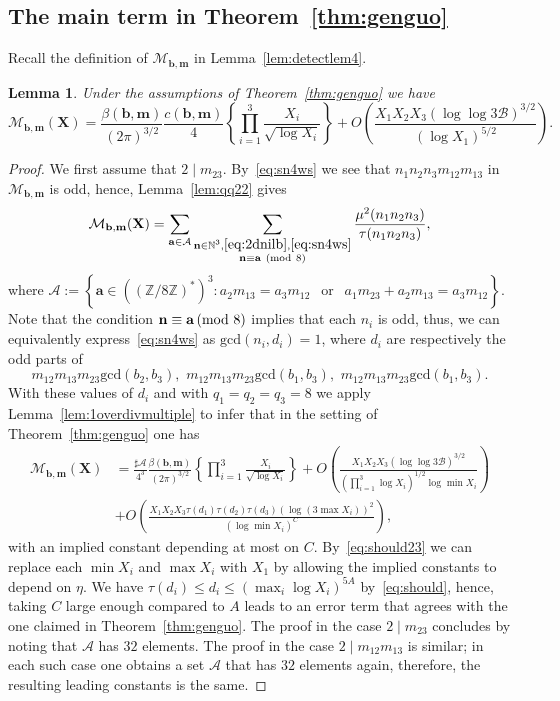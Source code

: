 \documentclass[a4paper,12pt,reqno]{amsart}
\numberwithin{equation}{section} \numberwithin{figure}{section}
\newcommand\Z{\mathbb{Z}}
\newcommand\N{\mathbb{N}}
\renewcommand{\mod}[1]{ \ \left(\textnormal{mod}\ #1\right)}
\newcommand{\md}[1]{  \left(\textnormal{mod}\ #1\right)}
\renewcommand{\l}{\left}
\renewcommand{\r}{\right}
\renewcommand{\b}{\mathbf}
\renewcommand{\c}{\mathcal}
\renewcommand{\gcd}{\textrm{gcd}}
\renewcommand{\leq}{\leqslant}
\renewcommand{\#}{\sharp}
\newtheorem{lemma}{Lemma}
\theoremstyle{definition}
\numberwithin{lemma}{section}
\begin{document}
 
\subsection{The main term in Theorem~\ref{thm:genguo}}
\label{s:maintermthrm}
Recall the definition of  $\c M_{\b b , \b m }$ in Lemma~\ref{lem:detectlem4}.
\begin{lemma}\label{maintermlemfg7}Under the assumptions of Theorem~\ref{thm:genguo} we have  
\[
\c M_{\b b , \b m }(\b X)
=
\frac{\beta(\b b , \b m )  }{(2\pi )^{3/2} }
\frac{c(\b b , \b m )}{4 }
\l\{
\prod_{i=1}^3 \frac{X_i }{ \sqrt{  \log X_i}   }  \r\}  
 +O\l(\frac{X_1X_2X_3 (\log \log 3\c B)^{3/2}}{(  \log X_1)^{5/2} }\r) 
.\]
\end{lemma}
\begin{proof}
We first assume that
 $2\mid m_{23}$.  By~\eqref{eq:sn4ws} we see that   $n_1n_2n_3 m_{12}m_{13}$ in $\c M_{\b b , \b m }$ 
is odd, hence,  Lemma~\ref{lem:qq22} gives 
$$\c M_{\b b , \b m }(\b X)=\sum_{ \b a \in \c A } 
\sum_{\substack{\b n \in \N^3, \eqref{eq:2dnilb}, \eqref{eq:sn4ws}  \\
\b n \equiv \b a \mod 8 }} 
 \frac{\mu^2(n_1n_2n_3)}{\tau(n_1n_2n_3 )} 
,$$where   $\c A:= \l\{ \b a \in  ((\Z/8\Z)^*)^3 :  a_2    m_{13} =      a_3   m_{12}   \ \  \text{ or }  \  \ 
a_1    m_{23} +a_2    m_{13}     =     a_3   m_{12}\r\} $.
Note that the condition $\b n \equiv \b a \md 8$ 
implies that each $n_i $ is odd, thus, we can equivalently express~\eqref{eq:sn4ws}
as $\gcd(n_i,d_i)=1$, where  $d_i$ are respectively the odd parts of 
$$
m_{12} m_{13}  m_{23}    \gcd(   b_2,b_3), \,\,
 m_{12} m_{13}  m_{23}    \gcd(   b_1,b_3), \,\, m_{12} m_{13}  m_{23}    \gcd(   b_1,b_3) 
.$$ With these values of $d_i$ and with  $q_1=q_2=q_3=8$ 
we apply     Lemma~\ref{lem:1overdivmultiple} to infer that in the setting of Theorem~\ref{thm:genguo} one has 
\begin{align*}  
\c M_{\b b , \b m }(\b X)
&
=
\frac{\#\c A}{4^3}
\frac{\beta(\b b , \b m )  }{(2\pi )^{3/2} }
\l\{
\prod_{i=1}^3 \frac{X_i }{ \sqrt{  \log X_i}   }  \r\}  
 +O\l(\frac{X_1X_2X_3 (\log \log 3\c B)^{3/2}}{(\prod_{i=1}^3 \log X_i)^{1/2}\log \min X_i }\r) 
\\&
+O\l(\frac{X_1X_2X_3\tau(d_1   )\tau(d_2   )\tau(d_3   )
(\log (3\max X_i)  )^2}{(\log \min  X_i)^C} \r),\end{align*}
with an implied constant depending at most on $C$.
By~\eqref{eq:should23}
we can replace each $\min X_i$ and $\max X_i$ with $X_1$ by allowing the implied constants to depend on $\eta$.
We have $\tau(d_i) \leq d_i\leq (\max_i \log  X_i)^{5A} $ by~\eqref{eq:should}, 
hence, taking $C$ large enough compared to $A$  leads to an error term that agrees with the one claimed in Theorem~\ref{thm:genguo}.
The proof in the case $2\mid m_{23}$ concludes by noting that  $\c A$ has  $ 32$ elements.
The proof in the case $2\mid m_{12}m_{13}$ is   similar; in each such case  one obtains a set $\c A$ that has $ 32$ elements again, therefore, 
the resulting leading constants is the same. 


\end{proof}
\end{document}
